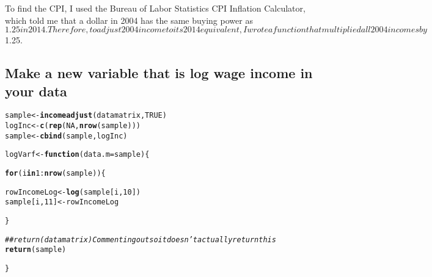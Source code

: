 \documentclass{article}\usepackage[]{graphicx}\usepackage[]{color}
\makeatletter
\newcommand{\hlnum}[1]{\textcolor[rgb]{0.686,0.059,0.569}{#1}}%
\newcommand{\hlcom}[1]{\textcolor[rgb]{0.678,0.584,0.686}{\textit{#1}}}%
\newcommand{\hlopt}[1]{\textcolor[rgb]{0,0,0}{#1}}%
\newcommand{\hlstd}[1]{\textcolor[rgb]{0.345,0.345,0.345}{#1}}%
\newcommand{\hlkwa}[1]{\textcolor[rgb]{0.161,0.373,0.58}{\textbf{#1}}}%
\newcommand{\hlkwb}[1]{\textcolor[rgb]{0.69,0.353,0.396}{#1}}%
\newcommand{\hlkwc}[1]{\textcolor[rgb]{0.333,0.667,0.333}{#1}}%
\newcommand{\hlkwd}[1]{\textcolor[rgb]{0.737,0.353,0.396}{\textbf{#1}}}%
\newenvironment{kframe}{%
 \def\at@end@of@kframe{}%
 \ifinner\ifhmode%
  \def\at@end@of@kframe{\end{minipage}}%
  \begin{minipage}{\columnwidth}%
 \fi\fi%
 \def\FrameCommand##1{\hskip\@totalleftmargin \hskip-\fboxsep
 \colorbox{shadecolor}{##1}\hskip-\fboxsep
     \hskip-\linewidth \hskip-\@totalleftmargin \hskip\columnwidth}%
 \MakeFramed {\advance\hsize-\width
   \@totalleftmargin\z@ \linewidth\hsize
   \@setminipage}}%
 {\par\unskip\endMakeFramed%
 \at@end@of@kframe}
\newenvironment{knitrout}{}{} %
\makeatother
\begin{document}
To find the CPI, I used the Bureau of Labor Statistics CPI Inflation Calculator, which told me that a dollar in 2004 has the same buying power as $1.25 in 2014. Therefore, to adjust 2004 income to its 2014 equivalent, I wrote a function that multiplied all 2004 incomes by $1.25.

\subsection{Make a new variable that is log wage income in your data}

\begin{knitrout}
\color{fgcolor}\begin{kframe}
\begin{alltt}
\hlstd{sample} \hlkwb{<-} \hlkwd{incomeadjust}\hlstd{(datamatrix,} \hlnum{TRUE}\hlstd{)}
\hlstd{logInc} \hlkwb{<-} \hlkwd{c}\hlstd{(}\hlkwd{rep}\hlstd{(}\hlnum{NA}\hlstd{,} \hlkwd{nrow}\hlstd{(sample)))}
\hlstd{sample} \hlkwb{<-} \hlkwd{cbind}\hlstd{(sample, logInc)}



\hlstd{logVarf} \hlkwb{<-} \hlkwa{function}\hlstd{(}\hlkwc{data.m} \hlstd{= sample)\{}

  \hlkwa{for} \hlstd{(i} \hlkwa{in} \hlnum{1}\hlopt{:}\hlkwd{nrow}\hlstd{(sample))\{}

    \hlstd{rowIncomeLog} \hlkwb{<-} \hlkwd{log}\hlstd{(sample[i,}\hlnum{10}\hlstd{])}
    \hlstd{sample[i,}\hlnum{11}\hlstd{]} \hlkwb{<-} \hlstd{rowIncomeLog}

  \hlstd{\}}

  \hlcom{## return(datamatrix) Commenting out so it doesn't actually return this}
  \hlkwd{return}\hlstd{(sample)}

\hlstd{\}}


\end{alltt}
\end{kframe}
\end{knitrout}
\end{document}
